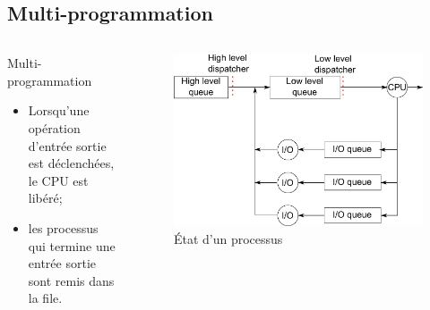 \begin{frame}{\sectitle}
\def\subsectitle{Multi-programmation}
\subsection{\subsectitle}

\begin{columns}[c]
\begin{block}{\subsectitle}
\begin{itemize}
    \item Lorsqu'une opération d'entrée sortie est déclenchées, le CPU est
    libéré;
    \item les processus qui termine une entrée sortie sont remis dans la file.
\end{itemize}
\end{block}

\begin{figure}
\includegraphics[width=\textwidth]{images/multiprogDispatching.pdf}
\caption{État d'un processus}
\end{figure}
\end{columns}

\end{frame}

\def\sectitle{Temps partagé}
